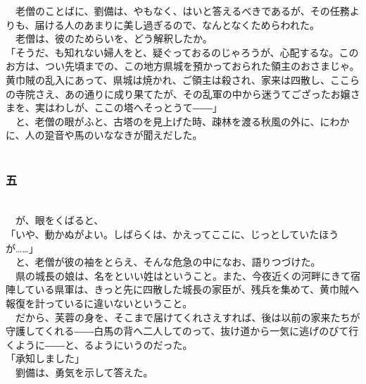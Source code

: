 \documentclass[
  paper=a5,
  fontsize=10pt,
  jafontsize=9.5pt,
  tate,                  %
  open_bracket_pos=nibu, %
]{jlreq}
\begin{document}
　老僧のことばに、劉備は、やもなく、はいと答えるべきであるが、その任務よりも、届ける人のあまりに美し過ぎるので、なんとなくためらわれた。\\


　老僧は、彼のためらいを、どう解釈したか。\\


「そうだ、も知れない婦人をと、疑ぐっておるのじゃろうが、心配するな。このお方は、つい先頃までの、この地方県城を預かっておられた領主のおさまじゃ。黄巾賊の乱入にあって、県城は焼かれ、ご領主は殺され、家来は四散し、ここらの寺院さえ、あの通りに成り果てたが、その乱軍の中から迷うてござったお嬢さまを、実はわしが、ここの塔へそっとうて――」\\


　と、老僧の眼がふと、古塔のを見上げた時、疎林を渡る秋風の外に、にわかに、人の跫音や馬のいななきが聞えだした。\\

\\

\subsubsection{五}

\\


　が、眼をくばると、\\


「いや、動かぬがよい。しばらくは、かえってここに、じっとしていたほうが……」\\


　と、老僧が彼の袖をとらえ、そんな危急の中になお、語りつづけた。\\


　県の城長の娘は、名をといい姓はということ。また、今夜近くの河畔にきて宿陣している県軍は、きっと先に四散した城長の家臣が、残兵を集めて、黄巾賊へ報復を計っているに違いないということ。\\


　だから、芙蓉の身を、そこまで届けてくれさえすれば、後は以前の家来たちが守護してくれる――白馬の背へ二人してのって、抜け道から一気に逃げのびて行くように――と、るようにいうのだった。\\


「承知しました」\\


　劉備は、勇気を示して答えた。\\
\end{document}
